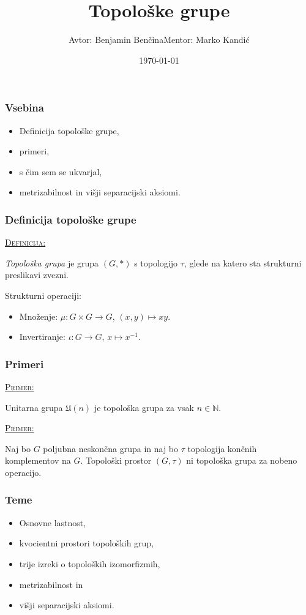 \documentclass[a4paper, 12pt]{beamer}
\title{Topološke grupe}
\author[Benjamin Benčina]{Avtor: Benjamin Benčina\newline \newline \footnotesize Mentor: Marko Kandić}
\institute[FMF]{Fakulteta za matematiko in fiziko}
\date{\today}
\newenvironment{matematika}[1]{
\textcolor{bostonuniversityred}{\underline{\textsc{#1:}}}
}{
}
\begin{document}
	
\titlepage

\begin{frame}
\frametitle{Vsebina}
\begin{itemize}[label = ]
	\item Definicija topološke grupe,
	\item primeri,
	\item s čim sem se ukvarjal,
	\item metrizabilnost in višji separacijski aksiomi.
\end{itemize}
\end{frame}

\begin{frame}
\frametitle{Definicija topološke grupe}
\begin{matematika}{Definicija}
	\emph{Topološka grupa} je grupa $(G, *)$ s topologijo $\tau$, glede na katero sta strukturni preslikavi zvezni.
\end{matematika}
\newline
\newline
Strukturni operaciji:
\begin{itemize}[label=]
	\item Množenje: $\mu : G \times G \to G$, $(x, y) \mapsto xy$.
	\item Invertiranje: $\iota : G \to G$, $x \mapsto x^{-1}$.
\end{itemize}
\end{frame}

\begin{frame}
\frametitle{Primeri}
\begin{matematika}{Primer}
Unitarna grupa $\mathfrak{U}(n)$ je topološka grupa za vsak $n \in \mathbb{N}$.\newline\newline
\end{matematika}
\begin{matematika}{Primer}
Naj bo $G$ poljubna neskončna grupa in naj bo $\tau$ topologija končnih komplementov na $G$. Topološki prostor $(G, \tau)$ ni topološka grupa za nobeno operacijo.
\end{matematika}
\end{frame}

\begin{frame}
\frametitle{Teme}
\begin{itemize}[label = ]
	\item Osnovne lastnost,
	\item kvocientni prostori topoloških grup,
	\item trije izreki o topoloških izomorfizmih,
	\item metrizabilnost in
	\item višji separacijski aksiomi.
\end{itemize}
\end{frame}
\end{document}

